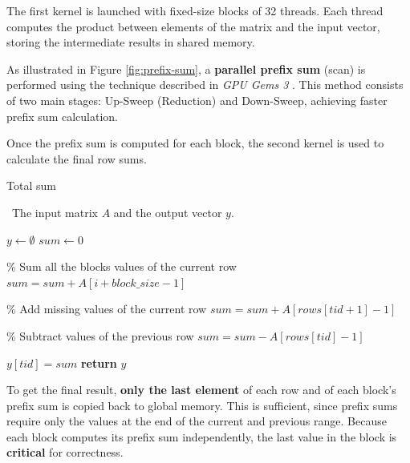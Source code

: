 \documentclass[conference]{IEEEtran}
\begin{document}
    The first kernel is launched with fixed-size blocks of 32 threads.
    Each thread computes the product between elements of the matrix and the
    input vector, storing the intermediate results in shared memory.

    As illustrated in Figure \ref{fig:prefix-sum}, a \textbf{parallel prefix
    sum} (scan) is performed using the technique described in \textit{GPU Gems
    3} \cite{harris2007prefixsum}.
    This method consists of two main stages: Up-Sweep (Reduction) and
    Down-Sweep, achieving faster prefix sum calculation.

    Once the prefix sum is computed for each block, the second kernel is used
    to calculate the final row sums.

    \begin{algorithm}[h!]
        \caption{Total sum}
        \algorithmicrequire~The input matrix $A$ and the output vector $y$.
        \begin{algorithmic}[1]
                \State $y \gets \emptyset$
                \State $sum \gets 0$

                \State \% Sum all the blocks values of the current row
                    \State $sum = sum + A[i + block\_size - 1]$
                \EndFor

                \State \% Add missing values of the current row
                    \State $sum = sum + A[rows[tid + 1] - 1]$
                \EndIf

                \State \% Subtract values of the previous row
                    \State $sum = sum - A[rows[tid] - 1]$
                \EndIf
                
                $y[tid] = sum$
                \State \textbf{return} $y$
            \EndProcedure
        \end{algorithmic}
        \label{alg:sum-and-store}
    \end{algorithm}

    To get the final result, \textbf{only the last element} of each row and of
    each block's prefix sum is copied back to global memory.
    This is sufficient, since prefix sums require only the values at the end of
    the current and previous range.
    Because each block computes its prefix sum independently, the last value in
    the block is \textbf{critical} for correctness.
    
\end{document}
